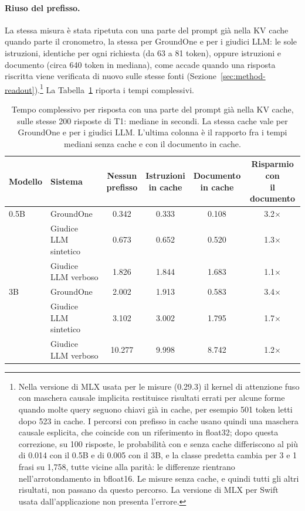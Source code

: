 \paragraph{Riuso del prefisso.} La stessa misura è stata ripetuta con una parte del prompt già nella KV cache quando
parte il cronometro, la stessa per GroundOne e per i giudici LLM: le sole istruzioni, identiche per ogni richiesta
(da 63 a 81 token), oppure istruzioni e documento (circa 640 token in mediana), come accade quando una risposta
riscritta viene verificata di nuovo sulle stesse fonti (Sezione~\ref{sec:method-readout}).\footnote{Nella versione di
MLX usata per le misure (0.29.3) il kernel di attenzione fuso con maschera causale implicita restituisce risultati errati
per alcune forme quando molte query seguono chiavi già in cache, per esempio 501 token letti dopo 523 in cache. I
percorsi con prefisso in cache usano quindi una maschera causale esplicita, che coincide con un riferimento in float32;
dopo questa correzione, su 100 risposte, le probabilità con e senza cache differiscono al più di 0.014 con il 0.5B e di 0.005 con il 3B, e la classe predetta cambia per 3 e 1 frasi su 1{,}758, tutte vicine alla parità: le differenze rientrano nell'arrotondamento in bfloat16. Le misure senza cache, e quindi tutti gli altri risultati, non passano da questo
percorso. La versione di MLX per Swift usata dall'applicazione non presenta l'errore.} La
Tabella~\ref{tab:results-prefix-cache} riporta i tempi complessivi.

\begin{table}[htbp]
\centering
\caption{Tempo complessivo per risposta con una parte del prompt già nella KV cache, sulle stesse 200 risposte di T1:
mediane in secondi. La stessa cache vale per GroundOne e per i giudici LLM. L'ultima colonna è il rapporto fra i tempi
mediani senza cache e con il documento in cache.}
\label{tab:results-prefix-cache}
\small
\setlength{\tabcolsep}{4pt}
\begin{tabular}{llcccc}
\toprule
Modello & Sistema & \makecell{Nessun\\prefisso} & \makecell{Istruzioni\\in cache} & \makecell{Documento\\in cache} & \makecell{Risparmio con\\il documento} \\
\midrule
0.5B & GroundOne & 0.342 & 0.333 & 0.108 & 3.2$\times$ \\
 & Giudice LLM sintetico & 0.673 & 0.652 & 0.520 & 1.3$\times$ \\
 & Giudice LLM verboso & 1.826 & 1.844 & 1.683 & 1.1$\times$ \\
\midrule
3B & GroundOne & 2.002 & 1.913 & 0.583 & 3.4$\times$ \\
 & Giudice LLM sintetico & 3.102 & 3.002 & 1.795 & 1.7$\times$ \\
 & Giudice LLM verboso & 10.277 & 9.998 & 8.742 & 1.2$\times$ \\
\bottomrule
\end{tabular}
\end{table}

